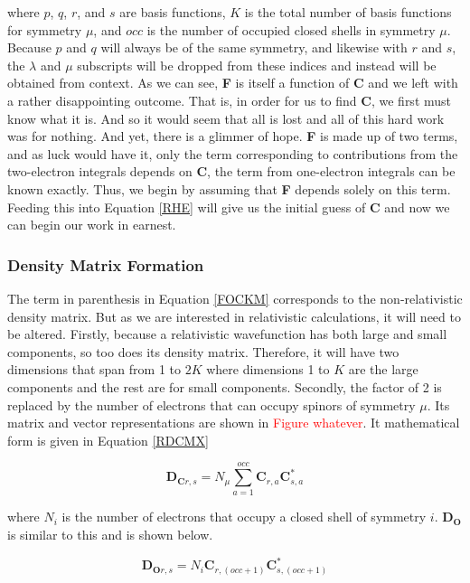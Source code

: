 \documentclass[12pt]{report}
\newcommand{\notetodylan}[1]{\textcolor{red}{#1}} %
\begin{document}
where $p$, $q$, $r$, and $s$ are basis functions, $K$ is the total number of basis functions for symmetry $\mu$, and $occ$ is the number of occupied closed shells in symmetry $\mu$. Because $p$ and $q$ will always be of the same symmetry, and likewise with $r$ and $s$, the $\lambda$ and $\mu$ subscripts will be dropped from these indices and instead will be obtained from context. As we can see, \textbf{F} is itself a function of \textbf{C} and we left with a rather disappointing outcome. That is, in order for us to find \textbf{C}, we first must know what it is. And so it would seem that all is lost and all of this hard work was for nothing. And yet, there is a glimmer of hope. \textbf{F} is made up of two terms, and as luck would have it, only the term corresponding to contributions from the two-electron integrals depends on \textbf{C}, the term from one-electron integrals can be known exactly. Thus, we begin by assuming that \textbf{F} depends solely on this term. Feeding this into Equation \ref{RHE} will give us the initial guess of \textbf{C} and now we can begin our work in earnest.

\subsubsection{Density Matrix Formation}
The term in parenthesis in Equation \ref{FOCKM} corresponds to the non-relativistic density matrix. But as we are interested in relativistic calculations, it will need to be altered. Firstly, because a relativistic wavefunction has both large and small components, so too does its density matrix. Therefore, it will have two dimensions that span from 1 to $2K$ where dimensions 1 to $K$ are the large components and the rest are for small components. Secondly, the factor of 2 is replaced by the number of electrons that can occupy spinors of symmetry $\mu$. Its matrix and vector representations are shown in \notetodylan{Figure whatever}. It mathematical form is given in Equation \ref{RDCMX}

\begin{equation}
\label{RDCMX}
\textbf{D$_{\textbf{C}r,s}$} =N_{\mu}\sum^{occ}_{a=1}\textbf{C}_{r,a}\textbf{C}^{*}_{s,a}
\end{equation}

where $N_{i}$ is the number of electrons that occupy a closed shell of symmetry $i$. \textbf{D$_\textbf{O}$} is similar to this and is shown below.

\begin{equation}
\label{RDOMX}
\textbf{D$_{\textbf{O}r,s}$} =N_{i}\textbf{C}_{r,(occ+1)}\textbf{C}^{*}_{s,(occ+1)}
\end{equation}
\end{document}
